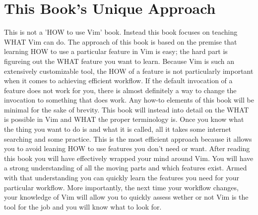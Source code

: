 \documentclass[12pt]{book}
\begin{document}
\section{This Book's Unique Approach}
This is not a 'HOW to use Vim' book.
Instead this book focuses on teaching WHAT Vim can do.
The approach of this book is based on the premise that learning HOW to use a particular feature in Vim is easy; the hard part is figureing out the WHAT feature you want to learn.
Because Vim is such an extensively customizable tool, the HOW of a feature is not particularly important when it comes to achieving efficient workflow.
If the default invocation of a feature does not work for you, there is almost definitely a way to change the invocation to something that does work.
Any how-to elements of this book will be minimal for the sake of brevity.
This book will instead into detail on the WHAT is possible in Vim and WHAT the proper terminology is.
Once you know what the thing you want to do is and what it is called, all it takes some internet searching and some practice.
This is the most efficient approach because it allows you to avoid leaning HOW to use features you don't need or want.
After reading this book you will have effectively wrapped your mind around Vim.
You will have a strong understanding of all the moving parts and which features exist.
Armed with that understanding you can quickly learn the features you need for your particular workflow.
More importantly, the next time your workflow changes, your knowledge of Vim will allow you to quickly assess wether or not Vim is the tool for the job and you will know what to look for.
\end{document}
